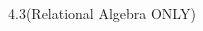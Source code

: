 




\homeworkheader{\classnameandsection}

\begin{problem}{3.12}
\end{problem}

\begin{problem}{3.14}
\end{problem}

\begin{problem}{4.2}
\end{problem}

\begin{problem}{4.3(Relational Algebra ONLY)}
\end{problem}

\begin{problem}{4.4}
\end{problem}

\begin{problem}{5.2}
\end{problem}

\begin{problem}{5.4}
\end{problem}



